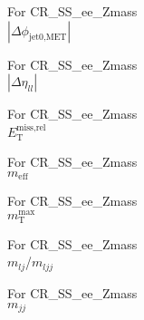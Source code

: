 \begin{frame}{For CR\_SS\_ee\_Zmass \\ $|\Delta\phi_{\text{jet0,MET}}|$}
\end{frame}

\begin{frame}{For CR\_SS\_ee\_Zmass \\ $|\Delta\eta_{ll}|$}
\end{frame}

\begin{frame}{For CR\_SS\_ee\_Zmass \\ $E_{\text{T}}^{\text{miss,rel}}$}
\end{frame}

\begin{frame}{For CR\_SS\_ee\_Zmass \\ $m_{\text{eff}}$}
\end{frame}

\begin{frame}{For CR\_SS\_ee\_Zmass \\ $m_{\text{T}}^{\text{max}}$}
\end{frame}

\begin{frame}{For CR\_SS\_ee\_Zmass \\ $m_{lj}$/$m_{ljj}$}
\end{frame}

\begin{frame}{For CR\_SS\_ee\_Zmass \\ $m_{jj}$}
\end{frame}

